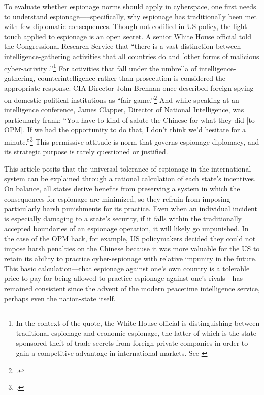 \documentclass[12pt]{extarticle}
\begin{document}
To evaluate whether espionage norms should apply in cyberspace, one first needs to understand espionage—--specifically, why espionage has traditionally been met with few diplomatic consequences. Though not codified in US policy, the light touch applied to espionage is an open secret. A senior White House official told the Congressional Research Service that \enquote{there is a vast distinction between intelligence-gathering activities that all countries do and [other forms of malicious cyber-activity].}\footnote{In the context of the quote, the White House official is distinguishing between traditional espionage and economic espionage, the latter of which is the state-sponsored theft of trade secrets from foreign private companies in order to gain a competitive advantage in international markets. See \cite{finklea_cyber_2015}} For activities that fall under the umbrella of intelligence-gathering, counterintelligence rather than prosecution is considered the appropriate response. CIA Director John Brennan once described foreign spying on domestic political institutions as \enquote{fair game.}\footcite{sanger_u.s._2016} And while speaking at an intelligence conference, James Clapper, Director of National Intelligence, was particularly frank: \enquote{You have to kind of salute the Chinese for what they did [to OPM]. If we had the opportunity to do that, I don’t think we’d hesitate for a minute.}\footcite{pepitone_clapper_2015} This permissive attitude is norm that governs espionage diplomacy, and its strategic purpose is rarely questioned or justified.


This article posits that the universal tolerance of espionage in the international system can be explained through a rational calculation of each state's incentives. On balance, all states derive benefits from preserving a system in which the consequences for espionage are minimized, so they refrain from imposing particularly harsh punishments for its practice. Even when an individual incident is especially damaging to a state's security, if it falls within the traditionally accepted boundaries of an espionage operation, it will likely go unpunished. In the case of the OPM hack, for example, US policymakers decided they could not impose harsh penalties on the Chinese because it was more valuable for the US to retain its ability to practice cyber-espionage with relative impunity in the future. This basic calculation---that espionage against one's own country is a tolerable price to pay for being allowed to practice espionage against one's rivals---has remained consistent since the advent of the modern peacetime intelligence service, perhaps even the nation-state itself.
\end{document}
